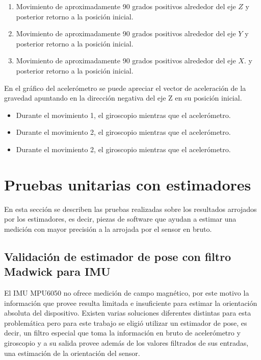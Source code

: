 \begin{enumerate}
    \item Movimiento de aproximadamente 90 grados positivos alrededor del eje $Z$ y posterior retorno a la posición inicial.
    \item Movimiento de aproximadamente 90 grados positivos alrededor del eje $Y$ y posterior retorno a la posición inicial.
    \item Movimiento de aproximadamente 90 grados positivos alrededor del eje $X$. y posterior retorno a la posición inicial.
\end{enumerate}

En el gráfico del acelerómetro se puede apreciar el vector de aceleración de la gravedad apuntando en la dirección negativa del eje Z en su posición inicial.
\begin{itemize}
    \item Durante el movimiento 1, el giroscopio mientras que el acelerómetro.
    \item Durante el movimiento 2, el giroscopio mientras que el acelerómetro.
    \item Durante el movimiento 2, el giroscopio mientras que el acelerómetro.
\end{itemize}

\section{Pruebas unitarias con estimadores}

En esta sección se describen las pruebas realizadas sobre los resultados arrojados por los estimadores, es decir, piezas de software que ayudan a estimar una medición con mayor precisión a la arrojada por el sensor en bruto.

\subsection{Validación de estimador de pose con filtro Madwick para IMU}

El IMU MPU6050 no ofrece medición de campo magnético, por este motivo la información que provee resulta limitada e insuficiente para estimar la orientación absoluta del dispositivo.
Existen varias soluciones diferentes distintas para esta problemática pero para este trabajo se eligió utilizar un estimador de pose, es decir, un filtro especial que toma la información en bruto de acelerómetro y giroscopio y a su salida provee además de los valores filtrados de sus entradas, una estimación de la orientación del sensor.

